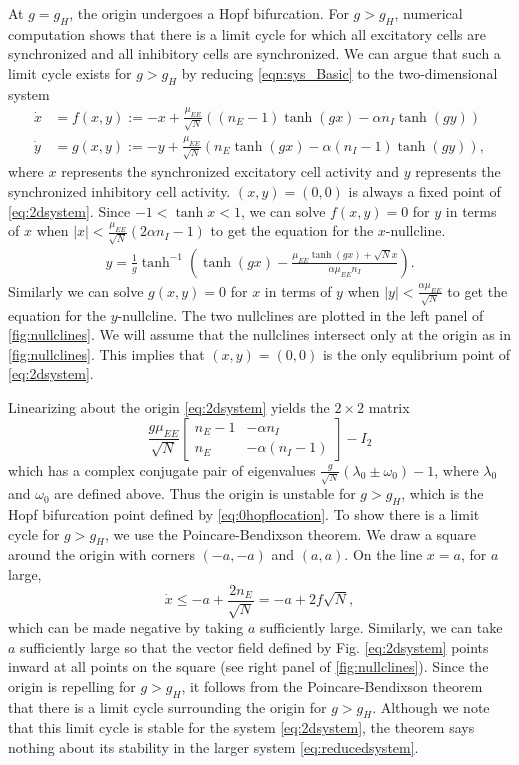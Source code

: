 \documentclass[11pt,reqno]{amsart}
\begin{document}
At $g = g_H$, the origin undergoes a Hopf bifurcation. For $g > g_H$, numerical computation shows that there is a limit cycle for which all excitatory cells are synchronized and all inhibitory cells are synchronized. We can argue that such a limit cycle exists for $g > g_H$ by reducing \cref{eqn:sys_Basic} to the two-dimensional system
\begin{equation}\label{eq:2dsystem}
\begin{aligned}
\dot{x} &= f(x, y) := -x + \frac{\mu_{EE}}{\sqrt{N}}\left((n_E - 1) \tanh(g x) - \alpha n_I \tanh(g y) \right) \\
\dot{y} &= g(x, y) := -y + \frac{\mu_{EE}}{\sqrt{N}}\left( n_E \tanh(g x) - \alpha (n_I - 1) \tanh(g y) \right), 
\end{aligned}
\end{equation}
where $x$ represents the synchronized excitatory cell activity and $y$ represents the synchronized inhibitory cell activity. $(x, y) = (0, 0)$ is always a fixed point of \cref{eq:2dsystem}. Since $-1 < \tanh x < 1$, we can solve $f(x, y) = 0$ for $y$ in terms of $x$ when $|x| < \frac{\mu_{EE}}{\sqrt{N}}( 2 \alpha n_I - 1)$ to get the equation for the $x$-nullcline.
\begin{align*}
y = \frac{1}{g} \tanh ^{-1} \left( \tanh (g x) - \frac{ \mu_{EE} \tanh (g x) + \sqrt{N} x}{\alpha \mu_{EE} n_I} \right).
\end{align*}
Similarly we can solve $g(x, y) = 0$ for $x$ in terms of $y$ when $|y| < \frac{\alpha \mu_{EE}}{\sqrt{N}}$ to get the equation for the $y$-nullcline. The two nullclines are plotted in the left panel of \cref{fig:nullclines}. We will assume that the nullclines intersect only at the origin as in \cref{fig:nullclines}. This implies that $(x,y) = (0,0)$ is the only equlibrium point of \cref{eq:2dsystem}. 

Linearizing about the origin \cref{eq:2dsystem} yields the $2 \times 2$ matrix
\[
\frac{g \mu_{EE}}{\sqrt{N}}
\begin{bmatrix} 
n_E - 1 & -\alpha n_I \\
n_E & -\alpha(n_I - 1)
\end{bmatrix} - I_2
\]
which has a complex conjugate pair of eigenvalues $\frac{g}{\sqrt{N}}(\lambda_0 \pm \omega_0) - 1$, where $\lambda_0$ and $\omega_0$ are defined above. Thus the origin is unstable for $g > g_H$, which is the Hopf bifurcation point defined by \cref{eq:0hopflocation}. To show there is a limit cycle for $g > g_H$, we use the Poincare-Bendixson theorem. We draw a square around the origin with corners $(-a, -a)$ and $(a, a)$. On the line $x = a$, for $a$ large, 
\[
\dot{x} \leq -a + \frac{2 n_E}{\sqrt{N}} = -a + 2 f \sqrt{N},
\]
which can be made negative by taking $a$ sufficiently large. Similarly, we can take $a$ sufficiently large so that the vector field defined by Fig. \ref{eq:2dsystem} points inward at all points on the square (see right panel of \cref{fig:nullclines}). Since the origin is repelling for $g > g_H$, it follows from the Poincare-Bendixson theorem that there is a limit cycle surrounding the origin for $g > g_H$. Although we note that this limit cycle is stable for the system \cref{eq:2dsystem}, the theorem says nothing about its stability in the larger system \cref{eq:reducedsystem}.
\end{document}
